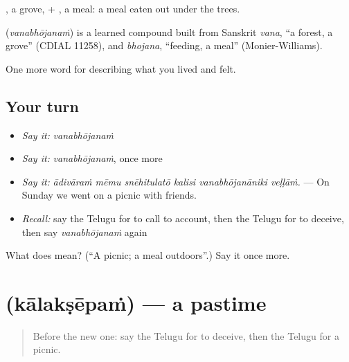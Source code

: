 , a grove, + , a meal: a meal eaten out under the trees.

\begin{cousinweb}
\textbf{} (\emph{vanabhōjanaṁ}) is a learned compound built from Sanskrit \emph{vana}, \textquotedblleft{}a forest, a grove\textquotedblright{} (CDIAL 11258), and \emph{bhojana}, \textquotedblleft{}feeding, a meal\textquotedblright{} (Monier-Williams).
\end{cousinweb}

\begin{grammarlens}[title={What you've built}]
One more word for describing what you lived and felt.
\end{grammarlens}

\subsection*{Your turn}
\begin{itemize}
\raggedright
  \item \emph{Say it:} \emph{vanabhōjanaṁ}
  \item \emph{Say it:} \emph{vanabhōjanaṁ}, once more
  \item \emph{Say it:} \emph{ādivāraṁ mēmu snēhitulatō kalisi vanabhōjanāniki veḷḷāṁ.} — On Sunday we went on a picnic with friends.
  \item \emph{Recall:} say the Telugu for to call to account, then the Telugu for to deceive, then say \emph{vanabhōjanaṁ} again
\end{itemize}

\begin{tcolorbox}[breakable,colback=teal!4,colframe=teal!35!black,title={Before you move on}]
What does  mean? (\textquotedblleft{}A picnic; a meal outdoors\textquotedblright{}.) Say it once more.
\end{tcolorbox}
\section[\texorpdfstring{\te{కాలక్షేపం} (kālakṣēpaṁ)}{కాలక్షేపం (kālakṣēpaṁ)}]{ (kālakṣēpaṁ) — a pastime}

\label{lesson:TE-C536-kalaksepam}



\begin{quote}
Before the new one: say the Telugu for to deceive, then the Telugu for a picnic.
\end{quote}

